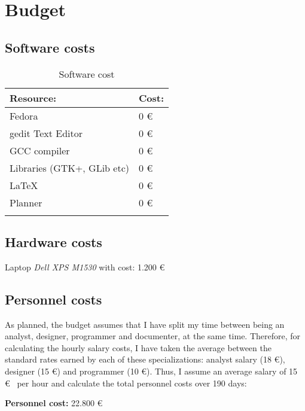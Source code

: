 \chapter{Budget}

\section{Software costs}\label{sec:SoftwareCosts}

\begin{table}[H]
  \begin{center}
    \begin{tabularx}{0.75\textwidth}{|X|X|}
      \firsthline
      \textbf{Resource:} & \textbf{Cost:} \\
      \hline
      Fedora & 0 \euro \\
      \hline
      gedit Text Editor & 0 \euro \\
      \hline
      GCC compiler & 0 \euro \\
      \hline
      Libraries (GTK+, GLib etc) & 0 \euro \\
      \hline
      \LaTeX & 0 \euro \\
      \hline
      Planner & 0 \euro \\
      \lasthline
    \end{tabularx}
    \caption{Software cost}
  \end{center}
\end{table}

\section{Hardware costs}\label{sec:HardwareCosts}

Laptop \emph{Dell XPS M1530} with cost: 1.200 \euro

\newpage
\section{Personnel costs}\label{sec:PersonnelCosts}

As planned, the budget assumes that I have split my time between being an analyst, designer, programmer and documenter, at the same time. Therefore, for calculating the hourly salary costs, I have taken the average between the standard rates earned by each of these specializations: analyst salary (18 \euro), designer (15 \euro) and programmer (10 \euro).  Thus, I assume an average salary of 15 \euro~ per hour and calculate the total personnel costs over 190 days:

\textbf{Personnel cost:} 22.800 \euro
